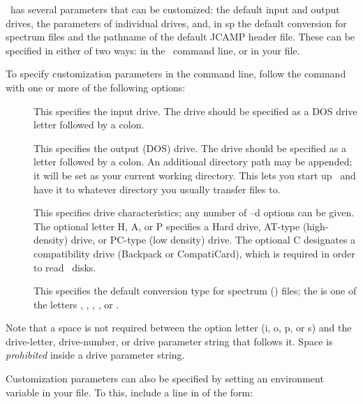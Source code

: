 \begin{itemize}
\RD\ has several parameters that can be customized:  the default input
and output drives, the parameters of individual drives, and, in 
\RD sp the default conversion for spectrum files and the pathname of
the default JCAMP header file.
These can be specified in either of two ways: in the \RD\ command line,
or in your  file.

To specify customization parameters in the command line,
follow the command  with one or more of the following
options:

\begin{description}

\item[ ] \nl
This specifies the input drive.  The drive should be specified
as a DOS drive letter followed by a colon.

\item[ ] \nl
This specifies the output (DOS) drive.  The drive should be specified
as a letter followed by a colon.  An additional directory path may be
appended; it will be set as your current working directory.  This lets
you start up \RD\ and have it  to whatever directory you
usually transfer files to.

\item[ ] \nl
This specifies drive characteristics; any number of --d options can be
given.  The optional letter H, A, or P specifies a Hard drive,
AT-type (high-density) drive, or PC-type (low density) drive.  The
optional C designates a compatibility drive (Backpack or CompatiCard), 
which is required in order to read \OS\ disks.

\item[ ] \nl
This specifies the default conversion type for spectrum ()
files; the  is one of the letters ,
, , , or .
 
\end{description}
\noindent Note that a space is not required between the option
letter (i, o, p, or s) and the drive-letter, drive-number, or drive
parameter string that follows it.  Space is {\em prohibited} inside a
drive parameter string.

Customization parameters can also be specified by setting an
environment variable in your  file.  To this,
include a line in  of the form:
\begin{quote}
 
\end{quote}


\end{itemize}
